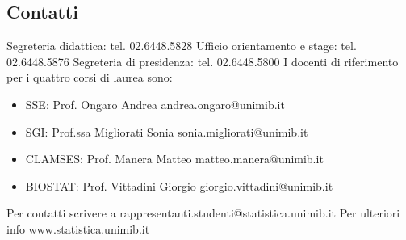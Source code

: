 \subsection{Contatti}
Segreteria didattica: tel. 02.6448.5828 
Ufficio orientamento e stage: tel. 02.6448.5876
Segreteria di presidenza: tel. 02.6448.5800 
I docenti di riferimento per i quattro corsi di laurea sono: 
\begin{itemize}
   \item SSE: Prof. Ongaro Andrea andrea.ongaro@unimib.it 
   \item SGI: Prof.ssa Migliorati Sonia sonia.migliorati@unimib.it 
   \item CLAMSES: Prof. Manera Matteo matteo.manera@unimib.it 
   \item BIOSTAT: Prof. Vittadini Giorgio giorgio.vittadini@unimib.it 
\end{itemize}
Per contatti scrivere a rappresentanti.studenti@statistica.unimib.it 
Per ulteriori info www.statistica.unimib.it 
